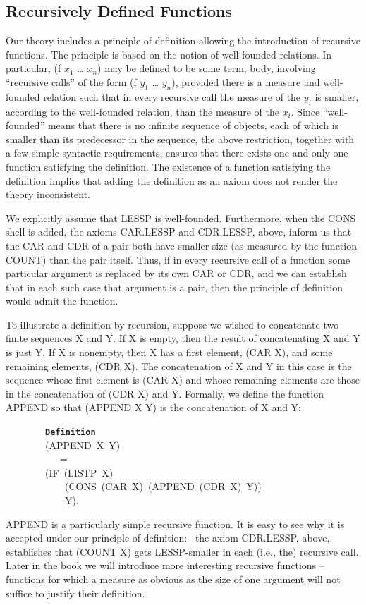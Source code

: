 \documentclass[11pt]{book}
\newenvironment{pubasis}{\begin{flushleft}\ttfamily\small}{\normalsize\rmfamily\end{flushleft}}
\newcommand{\axiomordefinition}[1]{\vspace{6pt}\texttt{\textbf{#1}}}
\newcommand{\pubdefaulttextsize}{\large}
\begin{document}
\subsection{Recursively Defined Functions}
\pubdefaulttextsize
Our theory includes a principle of definition allowing the introduction
of recursive functions.  The principle is based on the notion of well-founded
relations.  In particular, (f $x_{1}$ \ldots{} $x_{n}$) may be defined
to be some term, body, involving ``recursive calls'' of the form
(f $y_{1}$ \ldots{} $y_{n}$), provided there is a measure and well-founded relation
such that in every recursive call the measure of the $y_{i}$ is
smaller, according to the well-founded relation, than the measure of
the $x_{i}$.
Since ``well-founded'' means that there is no infinite sequence
of objects, each of which is smaller than its predecessor in the sequence,
the above restriction, together with a few simple syntactic requirements,
ensures that there exists one and only one function satisfying
the definition.  The existence of a function satisfying the
definition implies that adding the definition as an axiom does not
render the theory inconsistent.

We explicitly assume that LESSP
is well-founded.  Furthermore, when the
CONS shell is added, the axioms
CAR.LESSP and CDR.LESSP, above, inform us that the CAR and CDR of a pair
both have smaller size (as measured by the function COUNT) than the pair itself.
Thus, if in every recursive call of a function some particular argument is
replaced by
its own CAR or CDR, and we can establish that in each such case that
argument is a pair, then the principle of definition would
admit the function.

To illustrate a definition by recursion, suppose we wished to concatenate two finite
sequences X and Y.  If X is empty, then the result of
concatenating X and Y is just Y.  If X is nonempty, then X has
a first element, (CAR X), and some remaining elements, (CDR X).
The concatenation of X and Y in this case is the
sequence whose first element is (CAR X) and whose remaining elements
are those in the concatenation of (CDR X) and Y.  Formally, we define the function
APPEND so that (APPEND X Y) is the concatenation of X and Y:
\begin{pubasis}
~~~~~~~~\axiomordefinition{Definition}\\
~~~~~~~~(APPEND~X~Y)\\
~~~~~~~~~~~=\\
~~~~~~~~(IF~(LISTP~X)\\
~~~~~~~~~~~~(CONS~(CAR~X)~(APPEND~(CDR~X)~Y))\\
~~~~~~~~~~~~Y).\\
\end{pubasis}
APPEND is a particularly simple recursive function.  It is
easy to see why it is accepted under our principle of definition:~
the axiom CDR.LESSP, above, establishes that
(COUNT X) gets LESSP-smaller in each (i.e., the) recursive call.
Later in the book we will introduce more interesting recursive
functions -- functions for which a measure as obvious as the size of
one argument will not suffice to justify their definition.
\end{document}
